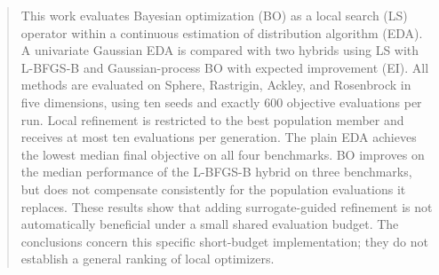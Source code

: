 \begin{abstract}
This work evaluates Bayesian optimization (BO) as a local search (LS) operator within a continuous estimation of distribution algorithm (EDA). A univariate Gaussian EDA is compared with two hybrids using LS with L-BFGS-B and Gaussian-process BO with expected improvement (EI). All methods are evaluated on Sphere, Rastrigin, Ackley, and Rosenbrock in five dimensions, using ten seeds and exactly 600 objective evaluations per run. Local refinement is restricted to the best population member and receives at most ten evaluations per generation. The plain EDA achieves the lowest median final objective on all four benchmarks. BO improves on the median performance of the L-BFGS-B hybrid on three benchmarks, but does not compensate consistently for the population evaluations it replaces. These results show that adding surrogate-guided refinement is not automatically beneficial under a small shared evaluation budget. The conclusions concern this specific short-budget implementation; they do not establish a general ranking of local optimizers.
\end{abstract}
